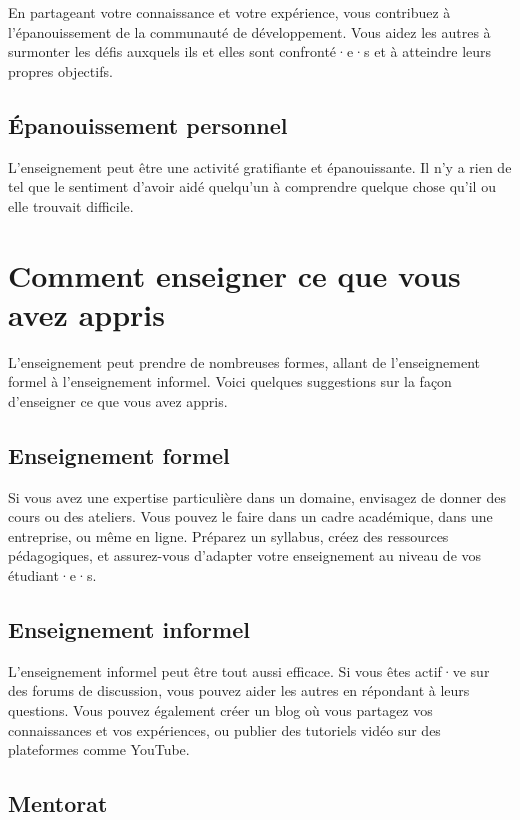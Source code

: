 En partageant votre connaissance et votre expérience, vous contribuez à l'épanouissement de la communauté de développement. Vous aidez les autres à surmonter les défis auxquels ils et elles sont confronté·e·s et à atteindre leurs propres objectifs.

\subsection{Épanouissement personnel}

L'enseignement peut être une activité gratifiante et épanouissante. Il n'y a rien de tel que le sentiment d'avoir aidé quelqu'un à comprendre quelque chose qu'il ou elle trouvait difficile.

\section{Comment enseigner ce que vous avez appris}

L'enseignement peut prendre de nombreuses formes, allant de l'enseignement formel à l'enseignement informel. Voici quelques suggestions sur la façon d'enseigner ce que vous avez appris.

\subsection{Enseignement formel}

Si vous avez une expertise particulière dans un domaine, envisagez de donner des cours ou des ateliers. Vous pouvez le faire dans un cadre académique, dans une entreprise, ou même en ligne. Préparez un syllabus, créez des ressources pédagogiques, et assurez-vous d'adapter votre enseignement au niveau de vos étudiant·e·s.

\subsection{Enseignement informel}

L'enseignement informel peut être tout aussi efficace. Si vous êtes actif·ve sur des forums de discussion, vous pouvez aider les autres en répondant à leurs questions. Vous pouvez également créer un blog où vous partagez vos connaissances et vos expériences, ou publier des tutoriels vidéo sur des plateformes comme YouTube.

\subsection{Mentorat}

